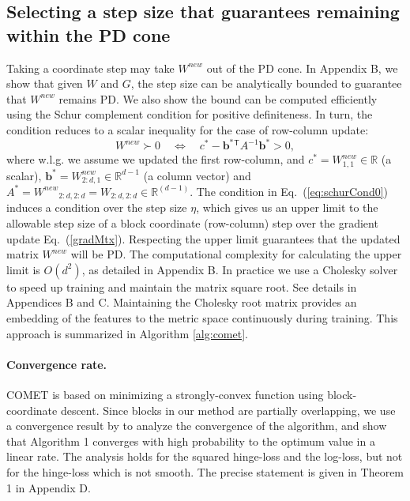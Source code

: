 \documentclass[twoside,11pt]{article}
\newcommand\mat[1]{{#1}}
\renewcommand\vec[1]{\mathbf{#1}}
\newcommand{\T}{{}^\mathsf{T}}
\newcommand{\W}{\mat{W}}
\newcommand{\newW}{{\mat{W^{new}}}}
\newcommand{\R}{\mathbb{R}}
\newcommand{\cholL}{\mat{L}}
\newcommand{\B}{\vec{b}}
\newcommand{\C}{c}
\newcommand{\invA}{A^{-1}}
\newcommand{\Wvec}{\W_{2:d,1}}
\newcommand{\Wscalar}{\W_{1,1}}
\renewcommand{\eqref}[1]{Eq.~(\ref{#1})}
\begin{document}
\subsection{Selecting a step size that guarantees remaining within the PD cone}\label{subsec:step} \vskip -4pt
Taking a coordinate step may take $\newW$ out of the PD cone. In Appendix B, we show that given $\W$ and $\mat{G}$, the step size can be analytically bounded to guarantee that $\newW$ remains PD. We also show the bound can be computed efficiently using the Schur complement condition for positive definiteness. In turn, the condition reduces to a scalar inequality for the case of row-column update:
\begin{equation}\label{eq:schurCond0}
  \newW \succ  0 \quad \Leftrightarrow \quad  \C^* - \B^*\T \invA \B^* >  0,
\end{equation}
where w.l.g. we assume we updated the first row-column, and $\C^* = \Wscalar^{new} \in \R$ (a scalar), $\B^* = \Wvec^{new} \in \R^{d-1}$ (a column vector) and $A^* = \newW_{2:d,2:d} = \W_{2:d,2:d}\in \R^{(d-1)}$. The condition in \eqref{eq:schurCond0} induces a condition over the step size $\eta$, which gives us an upper limit to the allowable step size of a block coordinate (row-column) step over the gradient update \eqref{gradMtx}. Respecting the upper limit guarantees that the updated matrix $\W^{new}$ will be PD. The computational complexity for calculating the upper limit is $O(d^2)$, as  detailed in Appendix B. In practice we use a Cholesky solver \citep{CHOLMOD} to speed up training and maintain the matrix square root. See details in Appendices B and C.
Maintaining the Cholesky root matrix provides an embedding of the features to the metric space continuously during  training. This approach is summarized in Algorithm \ref{alg:comet}.
\paragraph{Convergence rate.}
COMET is based on minimizing a strongly-convex function using block-coordinate descent. Since blocks in our method are partially overlapping, we use a convergence result by \citet{richtarik2013optimal} to analyze the convergence of the algorithm, and show that Algorithm 1 converges with high probability to the optimum value in a linear rate. The analysis holds for the squared hinge-loss and the log-loss, but not for the hinge-loss which is not smooth. The precise statement is given in Theorem 1 in Appendix D.
\end{document}

